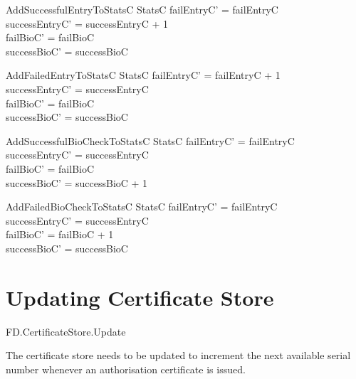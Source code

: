 \begin{schema}{AddSuccessfulEntryToStatsC}
        \Delta StatsC
\where
        failEntryC' = failEntryC 
\\      successEntryC' = successEntryC + 1
\\      failBioC' = failBioC
\\      successBioC' = successBioC 
\end{schema}

\begin{schema}{AddFailedEntryToStatsC}
        \Delta StatsC
\where
        failEntryC' = failEntryC + 1
\\      successEntryC' = successEntryC
\\      failBioC' = failBioC
\\      successBioC' = successBioC 
\end{schema}

\begin{schema}{AddSuccessfulBioCheckToStatsC}
        \Delta StatsC
\where
        failEntryC' = failEntryC
\\      successEntryC' = successEntryC
\\      failBioC' = failBioC
\\      successBioC' = successBioC + 1
\end{schema}

\begin{schema}{AddFailedBioCheckToStatsC}
        \Delta StatsC
\where
        failEntryC' = failEntryC
\\      successEntryC' = successEntryC
\\      failBioC' = failBioC + 1
\\      successBioC' = successBioC
\end{schema}

\section{Updating Certificate Store}

\begin{traceunit}{FD.CertificateStore.Update}
\end{traceunit}


The certificate store needs to be updated to increment the next
available serial number whenever an authorisation certificate is
issued.


